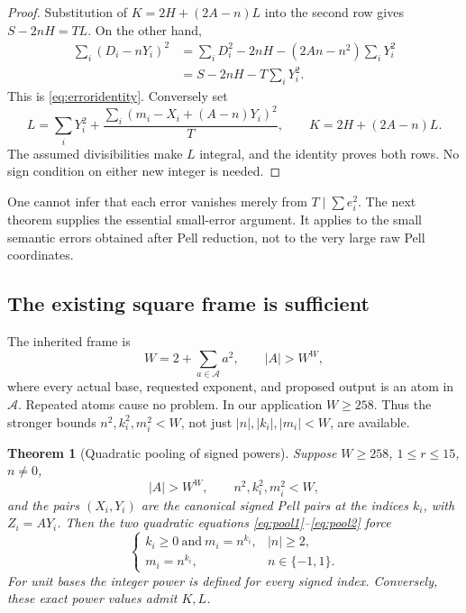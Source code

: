 \documentclass[11pt,letterpaper]{article}
\newtheorem{theorem}{Theorem}[section]
\theoremstyle{definition}\newtheorem{definition}[theorem]{Definition}
\theoremstyle{remark}\newtheorem{remark}[theorem]{Remark}
\begin{document}
\begin{proof}
Substitution of \(K=2H+(2A-n)L\) into the second row gives
\(S-2nH=TL\). On the other hand,
\begin{align*}
\sum_i(D_i-nY_i)^2
 &=\sum_iD_i^2-2nH-(2An-n^2)\sum_iY_i^2\\
 &=S-2nH-T\sum_iY_i^2.
\end{align*}
This is \eqref{eq:erroridentity}. Conversely set
\[
L=\sum_iY_i^2+
 \frac{\sum_i(m_i-X_i+(A-n)Y_i)^2}{T},
\qquad K=2H+(2A-n)L.
\]
The assumed divisibilities make \(L\) integral, and the identity proves
both rows. No sign condition on either new integer is needed.
\end{proof}

One cannot infer that each error vanishes merely from
\(T\mid\sum e_i^2\). The next theorem supplies the essential small-error
argument. It applies to the small semantic errors obtained after Pell
reduction, not to the very large raw Pell coordinates.

\subsection{The existing square frame is sufficient}

The inherited frame is
\begin{equation}\label{eq:frame}
W=2+\sum_{a\in\mathcal A}a^2,
\qquad |A|>W^W,
\end{equation}
where every actual base, requested exponent, and proposed output is an
atom in \(\mathcal A\). Repeated atoms cause no problem. In our application
\(W\ge258\). Thus the stronger bounds
\(n^2,k_i^2,m_i^2<W\), not just \(|n|,|k_i|,|m_i|<W\), are available.

\begin{theorem}[Quadratic pooling of signed powers]\label{thm:pool}
Suppose \(W\ge258\), \(1\le r\le15\), \(n\ne0\),
\[
|A|>W^W,\qquad n^2,k_i^2,m_i^2<W,
\]
and the pairs \((X_i,Y_i)\) are the canonical signed Pell pairs at the
indices \(k_i\), with \(Z_i=AY_i\). Then the two quadratic equations
\eqref{eq:pool1}--\eqref{eq:pool2} force
\[
\begin{cases}
k_i\ge0\ \text{and}\ m_i=n^{k_i},& |n|\ge2,\\
m_i=n^{k_i},& n\in\{-1,1\}.
\end{cases}
\]
For unit bases the integer power is defined for every signed index.
Conversely, these exact power values admit \(K,L\).
\end{theorem}
\end{document}
